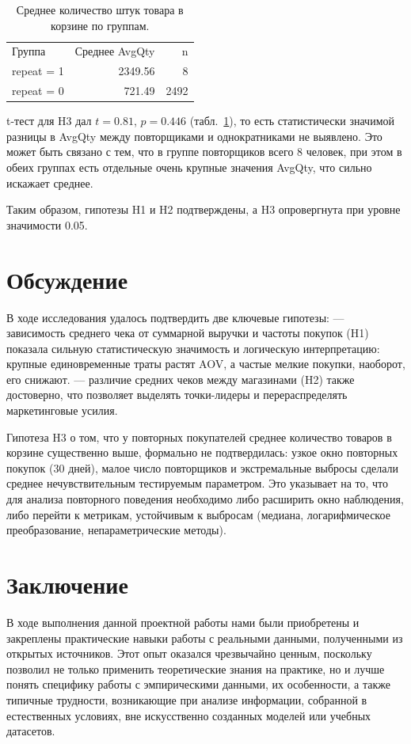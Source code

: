 \documentclass[a4paper]{article}
\begin{document}
\begin{table}[H]
  \centering
  \begin{tabular}{lrr}
    Группа & Среднее AvgQty & n \\
    repeat = 1 & 2349.56 & 8 \\
    repeat = 0 &  721.49 & 2492 \\
  \end{tabular}
  \caption{Среднее количество штук товара в корзине по группам.}
  \label{tab:h3_means}
\end{table}

\noindent
t-тест для H3 дал \(t=0.81\), \(p=0.446\) (табл.~\ref{tab:h3_means}), то есть статистически значимой разницы в AvgQty между повторщиками и однократниками не выявлено. Это может быть связано с тем, что в группе повторщиков всего 8 человек, при этом в обеих группах есть отдельные очень крупные значения AvgQty, что сильно искажает среднее.

Таким образом, гипотезы H1 и H2 подтверждены, а H3 опровергнута при уровне значимости 0.05.

\section{Обсуждение}
В ходе исследования удалось подтвердить две ключевые гипотезы:  
— зависимость среднего чека от суммарной выручки и частоты покупок (H1) показала сильную статистическую значимость и логическую интерпретацию: крупные единовременные траты растят AOV, а частые мелкие покупки, наоборот, его снижают.  
— различие средних чеков между магазинами (H2) также достоверно, что позволяет выделять точки-лидеры и перераспределять маркетинговые усилия.

Гипотеза H3 о том, что у повторных покупателей среднее количество товаров в корзине существенно выше, формально не подтвердилась: узкое окно повторных покупок (30 дней), малое число повторщиков и экстремальные выбросы сделали среднее нечувствительным тестируемым параметром. Это указывает на то, что для анализа повторного поведения необходимо либо расширить окно наблюдения, либо перейти к метрикам, устойчивым к выбросам (медиана, логарифмическое преобразование, непараметрические методы).

\section{Заключение}
В ходе выполнения данной проектной работы нами были приобретены и закреплены практические навыки работы с реальными данными, полученными из открытых источников. Этот опыт оказался чрезвычайно ценным, поскольку позволил не только применить теоретические знания на практике, но и лучше понять специфику работы с эмпирическими данными, их особенности, а также типичные трудности, возникающие при анализе информации, собранной в естественных условиях, вне искусственно созданных моделей или учебных датасетов.
\end{document}
